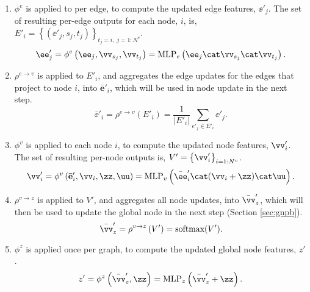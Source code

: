 \begin{enumerate}
\item $\phi^e$ is applied to per edge, to compute the updated edge features, $\ee'_j$.
The set of resulting per-edge outputs for each node, $i$, is,
$E'_i = \left\{\left(\ee'_j, s_j, t_j \right)\right\}_{t_j=i,\; j=1:N^e}$.
\begin{equation}
  \ee'_j = \phi^e\left(\ee_j, \vv_{s_j}, \vv_{t_j}\right) = \mathrm{MLP}_e\left(\ee_j \cat \vv_{s_j} \cat \vv_{t_j}\right).
\end{equation}

\item $\rho^{e\rightarrow v}$ is applied to $E'_i$, and aggregates the edge updates for the edges that project to node $i$, into $\mathbf{\bar{e}}'_i$, which will be used in node update in the next step. 
\begin{equation}
    \mathbf{\bar{\ee}'}_i = \rho^{e\rightarrow v}\left(E'_i\right) = \frac{1}{|E'_i|}\sum_{e'_j \in E'_i} \ee'_j.
\end{equation}

\item $\phi^v$ is applied to each node $i$,
to compute the updated node features, $\vv'_i$. 
The set of resulting per-node outputs is, $V'=\left\{\vv'_i\right\}_{i=1:N^v}$.
\begin{equation}
    \vv'_i = \phi^v\left(\mathbf{\bar{e}}'_i, \vv_i, \zz, \uu\right) = \mathrm{MLP}_v \left(\bar{\ee}'_i \cat (\vv_i + \zz) \cat \uu\right).
    \label{eq:node update}
\end{equation}

\item $\rho^{v \rightarrow z}$ is applied to $V'$, and aggregates all node updates, into $\bar{\vv}_z'$, which will then be used to update the global node in the next step (Section \ref{sec:gnpb}). 
\begin{equation}
    \bar{\vv}_z' = \rho^{v\rightarrow z}\left(V'\right) = {\text{softmax}}(V'). 
    \label{eq:aggr v2n}
\end{equation}

\item $\phi^z$ is applied once per graph, 
to compute the updated global node features, $z'$. 
\begin{equation}
    z' = \phi^z\left({\bar{\vv}}_z', \zz\right) = \mathrm{MLP}_z\left({\bar{\vv}}_z' + \zz\right).
    \label{eq:global node update}
\end{equation}


\end{enumerate}
